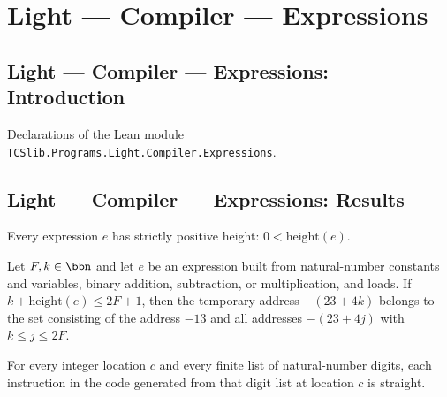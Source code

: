\section{Light --- Compiler --- Expressions}
\subsection*{Light --- Compiler --- Expressions: Introduction}

Declarations of the Lean module \texttt{TCSlib.Programs.Light.Compiler.Expressions}.

\subsection*{Light --- Compiler --- Expressions: Results}

\begin{theorem}
\label{Light.Expr.height_pos}
\leanok
{}
Every expression $e$ has strictly positive height: $0 < \mathrm{height}(e)$.
\end{theorem}

\begin{theorem}
\label{Light.Compiler.cT_mem_temps_of_height}
\leanok
{}
Let $F,k\in\bbn$ and let $e$ be an expression built from natural-number constants and
variables, binary addition, subtraction, or multiplication, and loads. If
$k+\mathrm{height}(e)\le 2F+1$, then the temporary address $-(23+4k)$ belongs to the set
consisting of the address $-13$ and all addresses $-(23+4j)$ with $k\le j\le 2F$.
\end{theorem}

\begin{theorem}
\label{Light.Compiler.straight_digitsCode}
\leanok
{}
For every integer location $c$ and every finite list of natural-number digits, each
instruction in the code generated from that digit list at location $c$ is straight.
\end{theorem}

